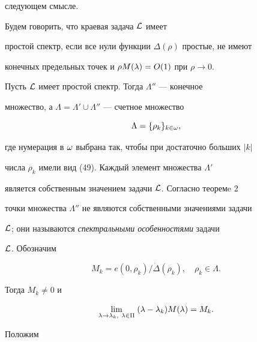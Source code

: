 следующем смысле.





\begin{defn}


Будем говорить, что краевая задача ${\cal L}$ имеет


простой спектр, если все нули функции $\Delta(\rho)$ простые, не имеют


конечных предельных точек и $\rho M(\lambda)=O(1)$ при $\rho\to 0$.


\end{defn}





Пусть ${\cal L}$ имеет простой спектр. Тогда $\Lambda''$ --- конечное


множество, а $\Lambda=\Lambda'\cup\Lambda''$ --- счетное множество


$$


\Lambda=\{\rho_k\}_{k\in\om},


$$


где нумерация в $\omega$ выбрана так, чтобы при достаточно больших $|k|$


числа $\rho_k$ имели вид (49). Каждый элемент множества  $\Lambda'$


является собственным значением задачи ${\cal L}$. Согласно теоремe 2


точки множества $\Lambda''$ не являются собственными значениями задачи


${\cal L}$; они называются {\it спектральными особенностями} задачи


${\cal L}$. Обозначим


\begin{equation}


M_k=e(0,\rho_k)/ \Dot\Delta(\rho_k),\quad \rho_k\in\Lambda.


\end{equation}


Тогда $M_k\ne 0$ и


\begin{equation}


\lim_{\la\to\la_k,\ \la\in\Pi}\; (\la-\la_k)M(\la)=M_k.


\end{equation}


Положим


